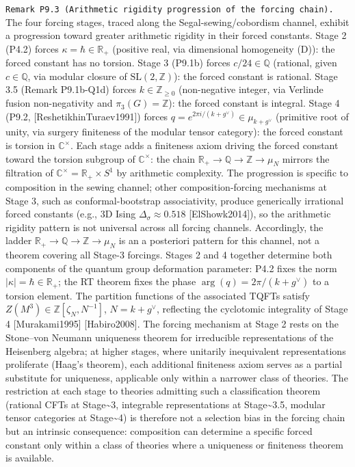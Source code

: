 \documentclass[
]{article}
\begin{document}
\texttt{Remark\ P9.3\ (Arithmetic\ rigidity\ progression\ of\ the\ forcing\ chain).}
The four forcing stages, traced along the Segal-sewing/cobordism
channel, exhibit a progression toward greater arithmetic rigidity in
their forced constants. Stage 2 (P4.2) forces
\(\kappa = \hbar \in \mathbb{R}_+\) (positive real, via dimensional
homogeneity (D)): the forced constant has no torsion. Stage 3 (P9.1b)
forces \(c/24 \in \mathbb{Q}\) (rational, given \(c \in \mathbb{Q}\),
via modular closure of \(\mathrm{SL}(2,\mathbb{Z})\)): the forced
constant is rational. Stage 3.5 (Remark P9.1b-Q1d) forces
\(k \in \mathbb{Z}_{\geq 0}\) (non-negative integer, via Verlinde fusion
non-negativity and \(\pi_3(G) = \mathbb{Z}\)): the forced constant is
integral. Stage 4 (P9.2, {[}ReshetikhinTuraev1991{]}) forces
\(q = e^{2\pi i/(k+g^\vee)} \in \mu_{k+g^\vee}\) (primitive root of
unity, via surgery finiteness of the modular tensor category): the
forced constant is torsion in \(\mathbb{C}^\times\). Each stage adds a
finiteness axiom driving the forced constant toward the torsion subgroup
of \(\mathbb{C}^\times\): the chain
\(\mathbb{R}_+ \to \mathbb{Q} \to \mathbb{Z} \to \mu_N\) mirrors the
filtration of \(\mathbb{C}^\times = \mathbb{R}_+ \times S^1\) by
arithmetic complexity. The progression is specific to composition in the
sewing channel; other composition-forcing mechanisms at Stage 3, such as
conformal-bootstrap associativity, produce generically irrational forced
constants (e.g., 3D Ising \(\Delta_\sigma \approx 0.518\)
{[}ElShowk2014{]}), so the arithmetic rigidity pattern is not universal
across all forcing channels. Accordingly, the ladder
\(\mathbb{R}_+ \to \mathbb{Q} \to \mathbb{Z} \to \mu_N\) is an a
posteriori pattern for this channel, not a theorem covering all Stage-3
forcings. Stages 2 and 4 together determine both components of the
quantum group deformation parameter: P4.2 fixes the norm
\(\lvert\kappa\rvert = \hbar \in \mathbb{R}_+\); the RT theorem fixes
the phase \(\arg(q) = 2\pi/(k+g^\vee)\) to a torsion element. The
partition functions of the associated TQFTs satisfy
\(Z(M^3) \in \mathbb{Z}[\zeta_N, N^{-1}]\), \(N = k + g^\vee\),
reflecting the cyclotomic integrality of Stage 4 {[}Murakami1995{]}
{[}Habiro2008{]}. The forcing mechanism at Stage 2 rests on the
Stone--von Neumann uniqueness theorem for irreducible representations of
the Heisenberg algebra; at higher stages, where unitarily inequivalent
representations proliferate (Haag's theorem), each additional finiteness
axiom serves as a partial substitute for uniqueness, applicable only
within a narrower class of theories. The restriction at each stage to
theories admitting such a classification theorem (rational CFTs at
Stage\textasciitilde3, integrable representations at
Stage\textasciitilde3.5, modular tensor categories at
Stage\textasciitilde4) is therefore not a selection bias in the forcing
chain but an intrinsic consequence: composition can determine a specific
forced constant only within a class of theories where a uniqueness or
finiteness theorem is available.
\end{document}
